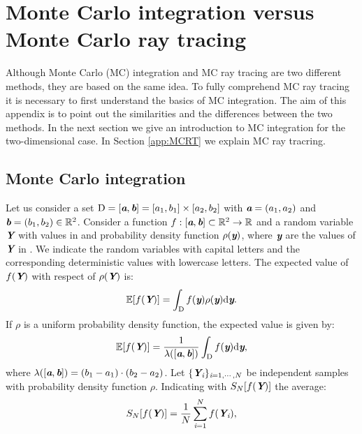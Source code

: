 \chapter{Monte Carlo integration versus Monte Carlo ray tracing}\label{chap:appraytracing}
Although Monte Carlo (MC)	 integration and MC ray tracing are two different methods, they are based on the same idea. To fully comprehend MC ray tracing it is necessary to first understand the basics of MC integration. The aim of this appendix is to point out the similarities and the differences between the two methods. In the next section we give an introduction to MC integration for the two-dimensional case. In Section \ref{app:MCRT} we explain MC ray tracring.
\section{Monte Carlo integration}
Let us consider a set $\mbox{$\textup{D}$} = [\textit{\textbf{a}}, \textit{\textbf{b}}]= [a_1, b_1] \times [a_2, b_2]$ with $\textit{\textbf{a}} = (a_1, a_2)$ and $\textit{\textbf{b}} = (b_1, b_2)\in\mathbb{R}^2$. Consider a function $f:[\textit{\textbf{a}},\textit{\textbf{b}}]\subset \mathbb{R}^2 \rightarrow \mathbb{R}$ and a random variable $\textit{\textbf{Y}}$ with values in  and probability density function $\rho(\textit{\textbf{y}})$, where $\textit{\textbf{y}}$ are the values of $\textit{\textbf{Y}}$ in . We indicate the random variables with capital letters and the corresponding deterministic values with lowercase letters. The expected value of $f(\textit{\textbf{Y}})$ with respect of $\rho(\textit{\textbf{Y}})$ is:
\begin{equation}
\mathbb{E}[f(\textit{\textbf{Y}})] =\int_{\textup{D}}f(\textit{\textbf{y}})\rho(\textit{\textbf{y}}) \textrm{d}\textit{\textbf{y}}.
\end{equation}
If $\rho$ is a uniform probability density function, the expected value is given by:
\begin{equation}\label{eq:expected_value}
\mathbb{E}[f(\textit{\textbf{Y}})] =\frac{1}{\lambda([\textit{\textbf{a}},\textit{\textbf{b}}])} \int_{\textup{D}}f(\textit{\textbf{y}}) \textrm{d}\textit{\textbf{y}},
\end{equation}
where $\lambda([\textit{\textbf{a}},\textit{\textbf{b}}]) = (b_1-a_1)\cdot(b_2-a_2)$.
Let $\{\textit{\textbf{Y}}_{\textit{i}}\}_{\textit{i} = 1, \cdots, N}$ be independent samples with probability density function $\rho$.
Indicating with $S_{N}[f(\textit{\textbf{Y}})]$ the average: 
\begin{equation}
S_{N}[f(\textit{\textbf{Y}})] = \frac{1}{N} \sum_{\textit{i}=1}^{N} f(\textit{\textbf{Y}}_{\textit{i}}),
\end{equation}
